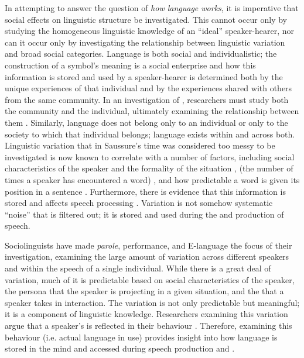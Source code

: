 In attempting to answer the question of \textit{how language works}, it is imperative that social effects on linguistic structure be investigated.  This cannot occur only by studying the homogeneous linguistic knowledge of an ``ideal'' speaker-hearer, nor can it occur only by investigating the relationship between linguistic variation and broad social categories.  Language is both social and individualistic; the construction of a symbol's meaning is a social enterprise and how this information is stored and used by a speaker-hearer is determined both by the unique experiences of that individual and by the experiences shared with others from the same community.  In an investigation of , researchers must study both the community and the individual, ultimately examining the relationship between them \cite[146]{wenger1998}.  Similarly, language does not belong only to an individual or only to the society to which that individual belongs; language exists within and across both.  Linguistic variation that in Saussure's time was considered too messy to be investigated is now known to correlate with a number of factors, including social characteristics of the speaker and the formality of the situation \cite{labov1972sociolingpatterns},  (the number of times a speaker has encountered a word) \cite{bybee2002-lvc}, and  how predictable a word is given its position in a sentence \cite{jurafskyetal2002}. Furthermore, there is evidence that this information is stored and affects speech processing \cite{strand1999,jurafsky2003}.  Variation is not somehow systematic ``noise'' that is filtered out; it is stored and used during the  and production of speech.

Sociolinguists have made \textit{parole}, performance, and E-language the focus of their investigation, examining the large amount of variation across different speakers and within the speech of a single individual.  While there is a great deal of variation, much of it is predictable based on social characteristics of the speaker, the persona that the speaker is projecting in a given situation, and the  that a speaker takes in interaction.  The variation is not only predictable but meaningful; it is a component of linguistic knowledge.  Researchers examining this variation argue that a speaker's  is reflected in their behaviour \cite{hymes1972}.  Therefore, examining this behaviour (i.e. actual language in use) provides insight into how language is stored in the mind and accessed during speech production and .  


